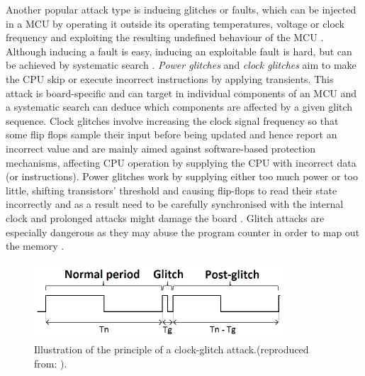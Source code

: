 Another popular attack type is inducing glitches or faults, which can be injected in a MCU by operating it outside its operating temperatures, voltage or clock frequency and exploiting the resulting undefined behaviour of the MCU \citep{sergei:thesis} \citep{avr_mega}. Although inducing a fault is easy, inducing an exploitable fault is hard, but can be achieved by systematic search \citep{sergei:thesis} \citep{glitches_paper} \citep{website:riscure}. \emph{Power glitches} and \emph{clock glitches} aim to make the CPU skip or execute incorrect instructions by applying transients. This attack is board-specific and can target in individual components of an MCU and a systematic search can deduce which components are affected by a given glitch sequence. Clock glitches involve increasing the clock signal frequency so that some flip flops sample their input before being updated and hence report an incorrect value \citep{sergei:thesis} and are mainly aimed against software-based protection mechanisms, affecting CPU operation by supplying the CPU with incorrect data (or instructions). Power glitches work by supplying either too much power or too little, shifting transistors' threshold and causing flip-flops to read their state incorrectly and as a result need to be carefully synchronised with the internal clock and prolonged attacks might damage the board \citep{sergei:thesis}. Glitch attacks are especially dangerous as they may abuse the program counter in order to map out the memory \citep{glitches_paper} \citep{anderson:cautionary_note} \citep{sergei:thesis}.

\begin{figure}
\center
\includegraphics[scale=0.7]{img/clock_glitch.png}
\caption{\footnotesize Illustration of the principle of a clock-glitch attack.(reproduced from: \protect\citep{glitches_paper}).}
\label{fig:glitch} 
\end{figure}

